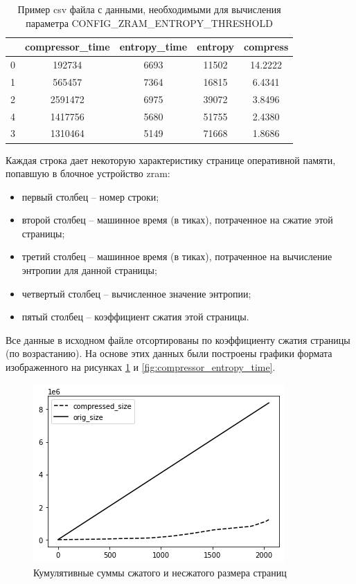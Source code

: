 \begin{table}[!htb]
	\label{table:threshold_data}
	\begin{center}
		\caption{Пример csv файла с данными, необходимыми для вычисления параметра CONFIG\_ZRAM\_ENTROPY\_THRESHOLD}
		\begin{tabular}{|c|c|c|c|c|}
			\hline
			\bfseries & \bfseries compressor\_time & \bfseries entropy\_time & \bfseries entropy & \bfseries compress \\ \hline
			0 & 192734 & 6693 & 11502 & 14.2222 \\ \hline
			1 &	565457	& 7364 & 16815 & 6.4341 \\ \hline
			2 & 2591472 & 6975 & 39072 & 3.8496
\\ \hline 
			4 & 1417756 & 5680 & 51755 & 2.4380
\\ \hline
			3 & 1310464 & 5149 & 71668 & 1.8686 \\ 
			\hline
		\end{tabular}
	\end{center}
\end{table}

Каждая строка дает некоторую характеристику странице оперативной памяти, попавшую в блочное устройство zram: 

\begin{itemize}
	\item первый столбец -- номер строки;
	\item второй столбец -- машинное время (в тиках), потраченное на сжатие этой страницы;
	\item третий столбец -- машинное время (в тиках), потраченное на вычисление энтропии для данной страницы;
	\item четвертый столбец -- вычисленное значение энтропии;
	\item пятый столбец -- коэффициент сжатия этой страницы.
\end{itemize}

Все данные в исходном файле отсортированы по коэффициенту сжатия страницы (по возрастанию). На основе этих данных были построены графики формата изображенного на рисунках \ref{fig:compressed_orig} и \ref{fig:compressor_entropy_time}.

\begin{figure}[h]
	\centering
	\includegraphics[scale=0.9]{img/compressed_orig.png}
	\caption{Кумулятивные суммы сжатого и несжатого размера страниц}
	\label{fig:compressed_orig}
\end{figure}

